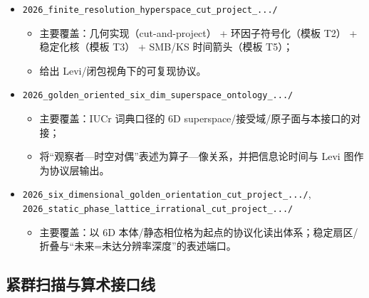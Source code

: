\begin{itemize}
  \item \texttt{2026\_finite\_resolution\_hyperspace\_cut\_project\_.../}
  \begin{itemize}
    \item 主要覆盖：几何实现（cut-and-project） + 环因子符号化（模板 T2） + 稳定化核（模板 T3） + SMB/KS 时间箭头（模板 T5）；
    \item 给出 Levi/闭包视角下的可复现协议。
  \end{itemize}

  \item \texttt{2026\_golden\_oriented\_six\_dim\_superspace\_ontology\_.../}
  \begin{itemize}
    \item 主要覆盖：IUCr 词典口径的 6D superspace/接受域/原子面与本接口的对接；
    \item 将“观察者—时空对偶”表述为算子—像关系，并把信息论时间与 Levi 图作为协议层输出。
  \end{itemize}

  \item \texttt{2026\_six\_dimensional\_golden\_orientation\_cut\_project\_.../},
  \texttt{2026\_static\_phase\_lattice\_irrational\_cut\_project\_.../}
  \begin{itemize}
    \item 主要覆盖：以 6D 本体/静态相位格为起点的协议化读出体系；稳定扇区/折叠与“未来=未达分辨率深度”的表述端口。
  \end{itemize}
\end{itemize}

\subsection{紧群扫描与算术接口线}

